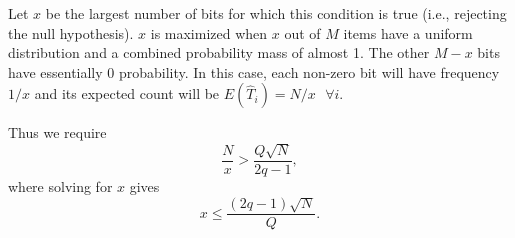 \documentclass{sig-alternate-2013}
\begin{document}
Let $x$ be the largest number of bits for which this condition is true (i.e., rejecting the null hypothesis). $x$ is maximized when $x$ out of $M$ items have a uniform distribution and a combined probability mass of almost 1. The other $M - x$ bits have essentially 0 probability. In this case, each non-zero bit will have frequency $1 / x$ and its expected count will be $E(\hat{T}_i) = N / x \text{ }\forall i$.

Thus we require
$$
\frac{N}{x} > \frac{Q\sqrt{N}}{2q - 1},
$$
where solving for $x$ gives
$$
x \le \frac{(2q - 1)\sqrt{N}}{Q}.
$$
\end{document}
